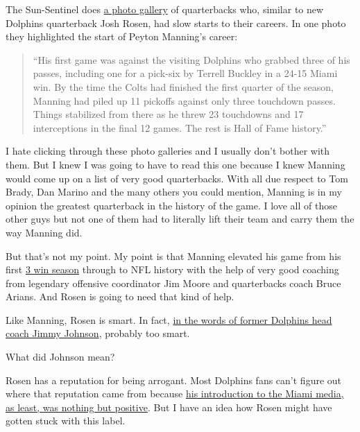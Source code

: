 \documentclass[11pt]{article}
\author{Tom Shannon}
\date{\today}
\title{}
\begin{document}
The Sun-Sentinel does \href{https://www.sun-sentinel.com/sports/miami-dolphins/sfl-star-nfl-qbs-whose-first-years-have-been-inferior-to-the-rest-of-their-careers-20190503-photogallery.html}{a photo gallery} of quarterbacks who, similar to new Dolphins quarterback Josh Rosen, had slow starts to their careers.  In one photo they highlighted the start of Peyton Manning's career:

\begin{quote}
  ``His first game was against the visiting Dolphins who grabbed three of his passes, including one for a pick-six by Terrell Buckley in a 24-15 Miami win. By the time the Colts had finished the first quarter of the season, Manning had piled up 11 pickoffs against only three touchdown passes. Things stabilized from there as he threw 23 touchdowns and 17 interceptions in the final 12 games. The rest is Hall of Fame history.''
\end{quote}

I hate clicking through these photo galleries and I usually don't bother with them.  But I knew I was going to have to read this one because I knew Manning would come up on a list of very good quarterbacks.  With all due respect to Tom Brady, Dan Marino and the many others you could mention, Manning is in my opinion the greatest quarterback in the history of the game.  I love all of those other guys but not one of them had to literally lift their team and carry them the way Manning did.

But that's not my point.  My point is that Manning elevated his game from his first \href{https://en.wikipedia.org/wiki/1998_Indianapolis_Colts_season}{3 win season} through to NFL history with the help of very good coaching from legendary offensive coordinator Jim Moore and quarterbacks coach Bruce Arians.  And Rosen is going to need that kind of help.

Like Manning, Rosen is smart.  In fact, \href{https://www.sun-sentinel.com/sports/dave-hyde-blog/fl-sp-hyde5-jimmy-johnson-rosen-20190503-story.html}{in the words of former Dolphins head coach Jimmy Johnson}, probably too smart.

What did Johnson mean?

Rosen has a reputation for being arrogant.  Most Dolphins fans can't figure out where that reputation came from because \href{https://www.sun-sentinel.com/sports/miami-dolphins/fl-sp-hyde-dolphins-rosen-20190429-story.html}{his introduction to the Miami media, as least, was nothing but positive}.  But I have an idea how Rosen might have gotten stuck with this label.
\end{document}
